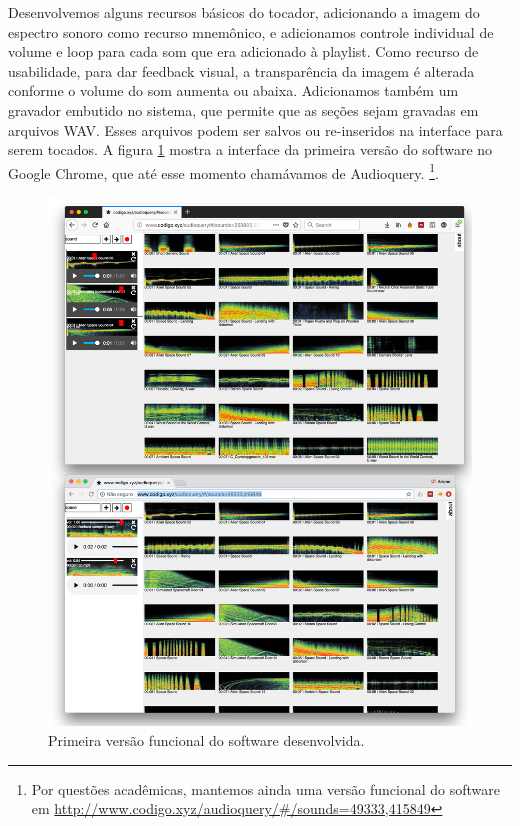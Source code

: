  Desenvolvemos alguns recursos básicos do tocador, adicionando a imagem do espectro sonoro como recurso mnemônico, e adicionamos controle individual de volume e loop para cada som que era adicionado à playlist. Como recurso de usabilidade, para dar feedback visual, a transparência da imagem é alterada conforme o volume do som aumenta ou abaixa. Adicionamos também um gravador embutido no sistema, que permite que as seções sejam gravadas em arquivos WAV. Esses arquivos podem ser salvos ou re-inseridos na interface para serem tocados. A figura \ref{fig:audioquery} mostra a interface da primeira versão do software no Google Chrome, que até esse momento chamávamos de Audioquery. \footnote{Por questões acadêmicas, mantemos ainda uma versão funcional do software em \url{http://www.codigo.xyz/audioquery/\#/sounds=49333,415849}}.

\begin{figure}

\includegraphics[width=1\textwidth]{pictures/cap4/audioquery_browsers}
\caption{\label{audiquery}Primeira versão funcional do software desenvolvida.}
\label{fig:audioquery}
\end{figure}

